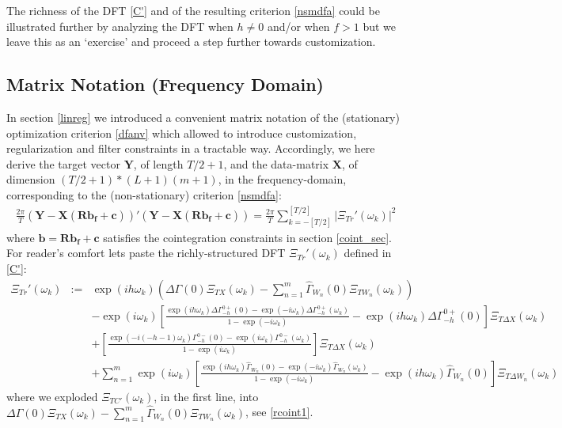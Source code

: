 \documentclass[11pt]{article}
\begin{document}
The richness of the DFT \ref{C'} and of the resulting criterion \ref{nsmdfa} could be illustrated further by analyzing the DFT when $h\not= 0$ and/or when $f>1$ but we leave this as an `exercise' and proceed a step further towards customization.





\subsection{Matrix Notation (Frequency Domain)}\label{matrixc not}

In section \ref{linreg} we introduced a convenient matrix notation of the (stationary) optimization criterion \ref{dfanv} which allowed to introduce customization, regularization and filter constraints in a tractable way. Accordingly, we here derive the target vector $\mathbf{Y}$, of length $T/2+1$, and the data-matrix $\mathbf{X}$, of dimension $(T/2+1)*(L+1)(m+1)$, in the frequency-domain, corresponding to the (non-stationary) criterion \ref{nsmdfa}:
\begin{eqnarray*}
\frac{2\pi}{T}\mathbf{(Y-X(Rb_f+c))'(Y-X(Rb_f+c))}=\frac{2\pi}{T}\sum_{k=-[T/2]}^{[T/2]}\left|\Xi_{Tr}'(\omega_k)\right|^2
\end{eqnarray*}
where $\mathbf{b=Rb_f+c}$ satisfies the cointegration constraints in section \ref{coint_sec}. For reader's comfort lets paste the richly-structured DFT $\Xi_{Tr}'(\omega_k)$ defined in \ref{C'}:  
\begin{eqnarray}
\Xi_{Tr}'(\omega_k)&:=& \exp(ih\omega_k)\left(\Delta\Gamma(0)\Xi_{TX}(\omega_k)-\sum_{n=1}^m\hat{\Gamma}_{W_n}(0)\Xi_{TW_n}(\omega_k)\right)\label{C''''}\\
&&-\exp(i\omega_k)\left[\frac{\exp(ih\omega_k)\Delta\Gamma_{-h}^{0+}(0)-\exp(-i\omega_k)\Delta\Gamma_{-h}^{0+}(\omega_k)}{1-\exp(-i\omega_k)}-\exp(ih\omega_k)\Delta\Gamma_{-h}^{0+}(0)\right]\Xi_{T\Delta X}(\omega_k)\nonumber\\
&&+\left[\frac{\exp(-i(-h-1)\omega_k)\Gamma_{-h}^{0-}(0)-\exp(i\omega_k)\Gamma_{-h}^{0-}(\omega_k)}{1-\exp(i\omega_k)}\right]\Xi_{T\Delta X}(\omega_k)\nonumber\\
&&+\sum_{n=1}^m\exp(i\omega_k)\left[\frac{\exp(ih\omega_k)\hat{\Gamma}_{W_n}(0)-\exp(-i\omega_k)\hat{\Gamma}_{W_n}(\omega_k)}{1-\exp(-i\omega_k)}-\exp(ih\omega_k)\hat{\Gamma}_{W_n}(0)\right]\Xi_{T\Delta W_n}(\omega_k)\nonumber
\end{eqnarray} 
where we exploded $\Xi_{TC'}(\omega_k)$, in the first line, into $\Delta\Gamma(0)\Xi_{TX}(\omega_k)-\sum_{n=1}^m\hat{\Gamma}_{W_n}(0)\Xi_{TW_n}(\omega_k)$, see \ref{rcoint1}.
\end{document}
